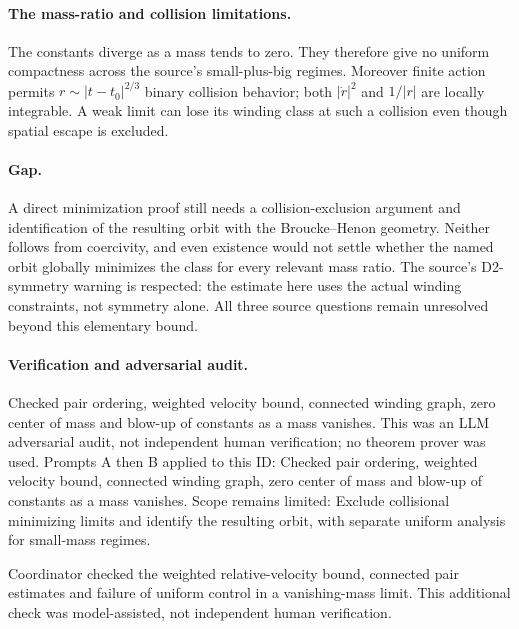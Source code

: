 \documentclass[11pt]{article}
\begin{document}
\paragraph{The mass-ratio and collision limitations.}The constants diverge as a mass tends to zero. They therefore give no uniform compactness across the source's small-plus-big regimes. Moreover finite action permits \(r\sim|t-t_0|^{2/3}\) binary collision behavior; both \(|\dot r|^2\) and \(1/|r|\) are locally integrable. A weak limit can lose its winding class at such a collision even though spatial escape is excluded.
\paragraph{Gap.}A direct minimization proof still needs a collision-exclusion argument and identification of the resulting orbit with the Broucke--Henon geometry. Neither follows from coercivity, and even existence would not settle whether the named orbit globally minimizes the class for every relevant mass ratio. The source's D2-symmetry warning is respected: the estimate here uses the actual winding constraints, not symmetry alone. All three source questions remain unresolved beyond this elementary bound.

\paragraph{Verification and adversarial audit.}
Checked pair ordering, weighted velocity bound, connected winding graph, zero center of mass and blow-up of constants as a mass vanishes. This was an LLM adversarial audit, not independent human verification; no theorem prover was used. Prompts A then B applied to this ID: Checked pair ordering, weighted velocity bound, connected winding graph, zero center of mass and blow-up of constants as a mass vanishes. Scope remains limited: Exclude collisional minimizing limits and identify the resulting orbit, with separate uniform analysis for small-mass regimes.

Coordinator checked the weighted relative-velocity bound, connected pair estimates and failure of uniform control in a vanishing-mass limit. This additional check was model-assisted, not independent human verification.
\end{document}
